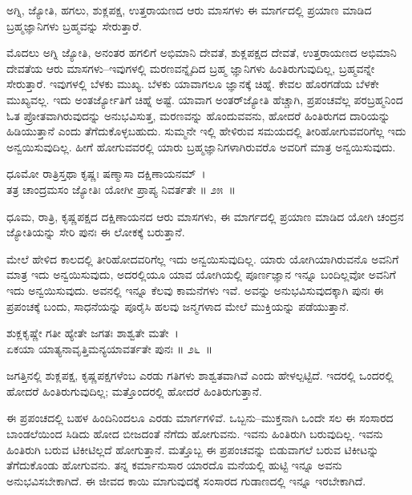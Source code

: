 \begin{artha}
ಅಗ್ನಿ, ಜ್ಯೋತಿ, ಹಗಲು, ಶುಕ್ಲಪಕ್ಷ, ಉತ್ತರಾಯಣದ ಆರು ಮಾಸಗಳು ಈ ಮಾರ್ಗದಲ್ಲಿ ಪ್ರಯಾಣ ಮಾಡಿದ ಬ್ರಹ್ಮಜ್ಞಾನಿಗಳು ಬ್ರಹ್ಮವನ್ನು ಸೇರುತ್ತಾರೆ.
\end{artha}

ಮೊದಲು ಅಗ್ನಿ ಜ್ಯೋತಿ, ಅನಂತರ ಹಗಲಿಗೆ ಅಭಿಮಾನಿ ದೇವತೆ, ಶುಕ್ಲಪಕ್ಷದ ದೇವತೆ, ಉತ್ತರಾಯಣದ ಅಭಿಮಾನಿ ದೇವತೆಯ ಆರು ಮಾಸಗಳು–ಇವುಗಳಲ್ಲಿ ಮರಣವನ್ನೈದಿದ ಬ್ರಹ್ಮ ಜ್ಞಾನಿಗಳು ಹಿಂತಿರುಗುವುದಿಲ್ಲ, ಬ್ರಹ್ಮವನ್ನೇ ಸೇರುತ್ತಾರೆ. ಇವುಗಳಲ್ಲಿ ಬೆಳಕು ಮುಖ್ಯ. ಬೆಳಕು ಯಾವಾಗಲೂ ಜ್ಞಾನಕ್ಕೆ ಚಿಹ್ನೆ. ಕೇವಲ ಹೊರಗಡೆಯ ಬೆಳಕೇ ಮುಖ್ಯವಲ್ಲ. ಇದು ಅಂತ\-ರ್ಜ್ಯೋತಿಗೆ ಚಿಹ್ನೆ ಅಷ್ಟೆ. ಯಾವಾಗ ಅಂತರ್​ಜ್ಯೋತಿ ಹೆಚ್ಚಾಗಿ, ಪ್ರಪಂಚವೆಲ್ಲ ಪರಬ್ರಹ್ಮನಿಂದ ಓತ ಪ್ರೋತವಾಗಿರುವುದನ್ನು ಅನುಭವಿಸುತ್ತ, ಮರಣವನ್ನು ಹೊಂದುವವನು, ಹೋದರೆ ಹಿಂತಿರುಗದ ದಾರಿಯನ್ನು ಹಿಡಿಯುತ್ತಾನೆ ಎಂದು ತೆಗೆದುಕೊಳ್ಳಬಹುದು. ಸುಮ್ಮನೇ ಇಲ್ಲಿ ಹೇಳಿರುವ ಸಮಯದಲ್ಲಿ ತೀರಿಹೋಗುವವರಿಗೆಲ್ಲ ಇದು ಅನ್ವಯಿಸುವುದಿಲ್ಲ. ಹೀಗೆ ಹೋಗುವವರಲ್ಲಿ ಯಾರು ಬ್ರಹ್ಮಜ್ಞಾನಿಗಳಾಗಿರುವರೊ ಅವರಿಗೆ ಮಾತ್ರ ಅನ್ವಯಿಸುವುದು.

\begin{shloka}
ಧೂಮೋ ರಾತ್ರಿಸ್ತಥಾ ಕೃಷ್ಣಃ ಷಣ್ಮಾಸಾ ದಕ್ಷಿಣಾಯನಮ್~।\\ತತ್ರ ಚಾಂದ್ರಮಸಂ ಜ್ಯೋತಿಃ ಯೋಗೀ ಪ್ರಾಪ್ಯ ನಿವರ್ತತೇ \hfill॥ ೨೫~॥
\end{shloka}

\begin{artha}
ಧೂಮ, ರಾತ್ರಿ, ಕೃಷ್ಣಪಕ್ಷದ ದಕ್ಷಿಣಾಯನದ ಆರು ಮಾಸಗಳು, ಈ ಮಾರ್ಗದಲ್ಲಿ ಪ್ರಯಾಣ ಮಾಡಿದ ಯೋಗಿ ಚಂದ್ರನ ಜ್ಯೋತಿಯನ್ನು ಸೇರಿ ಪುನಃ ಈ ಲೋಕಕ್ಕೆ ಬರುತ್ತಾನೆ.
\end{artha}

ಮೇಲೆ ಹೇಳಿದ ಕಾಲದಲ್ಲಿ ತೀರಿಹೋದವರಿಗೆಲ್ಲ ಇದು ಅನ್ವಯಿಸುವುದಿಲ್ಲ. ಯಾರು ಯೋಗಿಯಾಗಿರುವನೊ ಅವನಿಗೆ ಮಾತ್ರ ಇದು ಅನ್ವಯಿಸುವುದು, ಅದರಲ್ಲಿಯೂ ಯಾವ ಯೋಗಿಯಲ್ಲಿ ಪೂರ್ಣಜ್ಞಾನ ಇನ್ನೂ ಬಂದಿಲ್ಲವೋ ಅವನಿಗೆ ಇದು ಅನ್ವಯಿಸುವುದು. ಅವನಲ್ಲಿ ಇನ್ನೂ ಕೆಲವು ಕಾಮನೆಗಳು ಇವೆ. ಅವನ್ನು ಅನುಭವಿಸುವುದಕ್ಕಾಗಿ ಪುನಃ ಈ ಪ್ರಪಂಚಕ್ಕೆ ಬಂದು, ಸಾಧನೆಯನ್ನು ಪೂರೈಸಿ ಹಲವು ಜನ್ಮಗಳಾದ ಮೇಲೆ ಮುಕ್ತಿಯನ್ನು ಪಡೆಯುತ್ತಾನೆ.

\begin{shloka}
ಶುಕ್ಲಕೃಷ್ಣೇ ಗತೀ ಹ್ಯೇತೇ ಜಗತಃ ಶಾಶ್ವತೇ ಮತೇ~।\\ಏಕಯಾ ಯಾತ್ಯನಾವೃತ್ತಿಮನ್ಯಯಾವರ್ತತೇ ಪುನಃ \hfill॥ ೨೬~॥
\end{shloka}

\begin{artha}
ಜಗತ್ತಿನಲ್ಲಿ ಶುಕ್ಲಪಕ್ಷ, ಕೃಷ್ಣಪಕ್ಷಗಳೆಂಬ ಎರಡು ಗತಿಗಳು ಶಾಶ್ವತವಾಗಿವೆ ಎಂದು ಹೇಳಲ್ಪಟ್ಟಿದೆ. ಇದರಲ್ಲಿ ಒಂದರಲ್ಲಿ ಹೋದರೆ ಹಿಂತಿರುಗುವುದಿಲ್ಲ; ಮತ್ತೊಂದರಲ್ಲಿ ಹೋದರೆ ಹಿಂತಿರುಗುತ್ತಾನೆ.
\end{artha}

ಈ ಪ್ರಪಂಚದಲ್ಲಿ ಬಹಳ ಹಿಂದಿನಿಂದಲೂ ಎರಡು ಮಾರ್ಗಗಳಿವೆ. ಒಬ್ಬನು–ಮುಕ್ತನಾಗಿ ಒಂದೇ ಸಲ ಈ ಸಂಸಾರದ ಬಾಂಡಲೆಯಿಂದ ಸಿಡಿದು ಹೋದ ಬೀಜದಂತೆ ನೆಗೆದು ಹೋಗುವನು. ಇವನು ಹಿಂತಿರುಗಿ ಬರುವುದಿಲ್ಲ. ಇವನು ಹಿಂತಿರುಗಿ ಬರುವ ಟಿಕೀಟಿಲ್ಲದೆ ಹೋಗುತ್ತಾನೆ. ಮತ್ತೊಬ್ಬ ಈ ಪ್ರಪಂಚವನ್ನು ಬಿಡುವಾಗಲೆ ಬರುವ ಟಿಕೀಟನ್ನು ತೆಗೆದುಕೊಂಡು ಹೋಗುವನು. ತನ್ನ ಕರ್ಮಾನುಸಾರ ಯಾರದೊ ಮನೆಯಲ್ಲಿ ಹುಟ್ಟಿ ಇನ್ನೂ ಅವನು ಅನುಭವಿಸಬೇಕಾಗಿದೆ. ಈ ಜೀವದ ಕಾಯಿ ಮಾಗುವುದಕ್ಕೆ ಸಂಸಾರದ ಗುಡಾಣದಲ್ಲಿ ಇನ್ನೂ ಇರಬೇಕಾಗಿದೆ.

